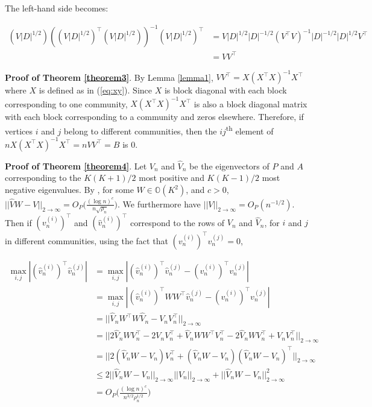 \documentclass[
  12pt,
]{article}
\begin{document}
The left-hand side becomes:

\[\begin{split}
  (V |D|^{1/2}) ((V |D|^{1/2})^\top (V |D|^{1/2}))^{-1} (V |D|^{1/2})^\top & =
    V |D|^{1/2} |D|^{-1/2} (V^\top V)^{-1} |D|^{-1/2} |D|^{1/2} V^\top \\
  & = V V^\top
\end{split}\]

\textbf{Proof of Theorem \ref{theorem3}}. By Lemma \ref{lemma1},
\(V V^\top = X (X^\top X)^{-1} X^\top\) where \(X\) is defined as in
(\ref{eq:xy}). Since \(X\) is block diagonal with each block
corresponding to one community, \(X (X^\top X)^{-1} X^\top\) is also a
block diagonal matrix with each block corresponding to a community and
zeros elsewhere. Therefore, if vertices \(i\) and \(j\) belong to
different communities, then the \(ij\)\textsuperscript{th} element of
\(n X (X^\top X)^{-1} X^\top = n V V^\top = B\) is 0.

\textbf{Proof of Theorem \ref{theorem4}}. Let \(V_n\) and \(\hat{V}_n\)
be the eigenvectors of \(P\) and \(A\) corresponding to the
\(K (K + 1) / 2\) most positive and \(K (K - 1) / 2\) most negative
eigenvalues. By \citeauthor{rubindelanchy2017statistical}, for some
\(W \in \mathbb{O}(K^2)\), and \(c > 0\),\\
\(||\hat{V} W - V||_{2 \to \infty} = O_P \big(\frac{(\log n)^c}{n \sqrt{\rho_n}} \big)\).
We furthermore have \(||V||_{2 \to \infty} = O_P(n^{-1/2})\). Then if
\((v_n^{(i)})^\top\) and \((\hat{v}_n^{(i)})^\top\) correspond to the
rows of \(V_n\) and \(\hat{V}_n\), for \(i\) and \(j\) in different
communities, using the fact that \((v_n^{(i)})^\top v_n^{(j)} = 0\),

\[\begin{split}
\max_{i, j} |(\hat{v}_n^{(i)})^\top \hat{v}_n^{(j)}| &
= \max_{i, j} |(\hat{v}_n^{(i)})^\top \hat{v}_n^{(j)} - 
(v_n^{(i)})^\top v_n^{(j)}| \\
& = \max_{i, j} |(\hat{v}_n^{(i)})^\top W W^\top \hat{v}_n^{(j)} -
(v_n^{(i)})^\top v_n^{(j)}| \\
& = ||\hat{V}_n W^\top W \hat{V}_n - V_n V_n^\top||_{2 \to \infty} \\
& = ||2 \hat{V}_n W V_n^\top - 2 V_n V_n^\top + \hat{V}_n W W^\top V_n^\top - 
2 \hat{V}_n W V_n^\top + V_n V_n^\top||_{2 \to \infty} \\
& = ||2 (\hat{V}_n W - V_n) V_n^\top + 
(\hat{V}_n W - V_n) (\hat{V}_n W - V_n)^\top ||_{2 \to \infty} \\
& \leq 2 ||\hat{V}_n W - V_n||_{2 \to \infty} ||V_n||_{2 \to \infty} +
||\hat{V}_n W - V_n||_{2 \to \infty}^2 \\
& = O_P \Big( \frac{(\log n)^c}{n^{3/2} \rho_n^{1/2}} \Big)
\end{split}\]
\end{document}
